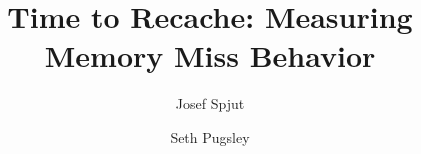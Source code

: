 \documentclass[times, 10pt, twocolumn]{article}
\begin{document}
\title{Time to Recache: Measuring Memory Miss Behavior}

\author{Josef Spjut \and Seth Pugsley}
\date{}

\maketitle

\begin{abstract}

\end{abstract}











\end{document}
